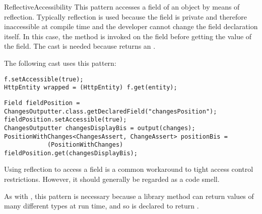 \begin{pattern}{ReflectiveAccessibility}
This pattern accesses a field of an object by means of reflection.
Typically reflection is used because the field is private and therefore
inaccessible at compile time and the developer cannot change the field
declaration itself.
In this case, the method  is invoked on the field
before getting the value of the field.
The cast is needed because  returns an .

\instances{}
The following cast%
\def\urlvar{http://bit.ly/loopj_android_async_http_2SOISRr}
uses this pattern:

\begin{verbatim}
f.setAccessible(true);
HttpEntity wrapped = (HttpEntity) f.get(entity);
\end{verbatim}


\def\urlvar{http://bit.ly/joel_costigliola_assertj_db_2Ip1Rho}

\begin{verbatim}
Field fieldPosition = ChangesOutputter.class.getDeclaredField("changesPosition");
fieldPosition.setAccessible(true);
ChangesOutputter changesDisplayBis = output(changes);
PositionWithChanges<ChangesAssert, ChangeAssert> positionBis = 
            (PositionWithChanges) fieldPosition.get(changesDisplayBis);
\end{verbatim}


\discussion{}
Using reflection to access a field is a common workaround to tight access
  control restrictions. However, it should generally be regarded as a code
  smell.

As with , this pattern is necessary because
a library method can return values of many different types at run time,
and so is declared to return .


\end{pattern}
